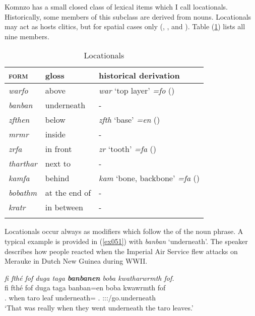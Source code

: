 Komnzo has a small closed class of lexical items which I call locationals. Historically, some members of this subclass are derived from nouns. Locationals may act as hosts  clitics, but for spatial cases only (, , and ). Table (\ref{locationaltable}) lists all nine members.

\begin{table}
\caption{Locationals}
\label{locationaltable}
	\begin{tabularx}{\textwidth}{XXl}
		\lsptoprule
		\textsc{form}&{gloss}&{historical derivation}\\ \midrule
		\emph{warfo}&above&\emph{war} `top layer' \emph{=fo} (\All{})\\
		\emph{banban}&underneath&-\\
		\emph{zfthen}&below&\emph{zfth} `base' \emph{=en} (\Loc{})\\
		\emph{mrmr}&inside&-\\
		\emph{zrfa}&in front&\emph{zr} `tooth' \emph{=fa} (\Abl{})\\
		\emph{tharthar}&next to&-\\
		\emph{kamfa}&behind&\emph{kam} `bone, backbone' \emph{=fa} (\Abl{})\\
		\emph{bobathm}&at the end of&-\\
		\emph{kratr}&in between&-\\
		\lspbottomrule
	\end{tabularx}
\end{table}%

Locationals occur always as modifiers which follow the  of the noun phrase. A typical example is provided in (\ref{ex051}) with \emph{banban} `underneath'. The speaker describes how people reacted when the Imperial  Air Service flew attacks on Merauke in Dutch New Guinea during WWII.%

\begin{exe}
	\ex \emph{fi fthé fof duga taga \textbf{banbanen} boba kwatharwrmth fof.}\\
	\gll fi fthé fof duga taga banban=en boba kwawrmth fof\\
	\Tsg.\Abs{} when \Emph{} taro leaf underneath=\Loc{} \Med.\Abl{} \Stpl:\Sbj:\Pst:\Dur/go.underneath \Emph{}\\
	\trans `That was really when they went underneath the taro leaves.'\\ 
	\label{ex051}
\end{exe}

